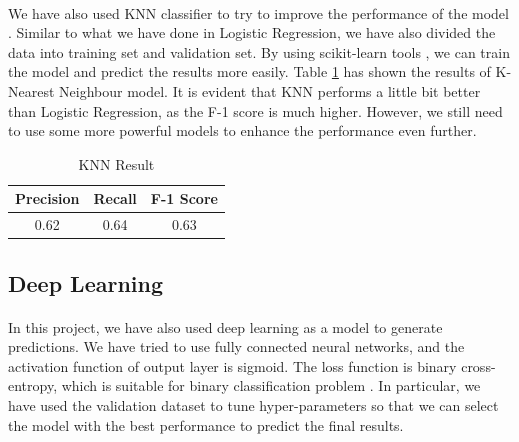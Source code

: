 \documentclass[fleqn,11pt]{olplainarticle}
\begin{document}
\paragraph*{}
We have also used KNN classifier to try to improve the performance of the model \citep{Rebala2019}. Similar to what we have done in Logistic Regression, we have also divided the data into training set and validation set. By using scikit-learn tools \citep{scikit-learn}, we can train the model and predict the results more easily. Table \ref{tab:knn} has shown the results of K-Nearest Neighbour model. It is evident that KNN performs a little bit better than Logistic Regression, as the F-1 score is much higher. However, we still need to use some more powerful models to enhance the performance even further.

\begin{table}[!htbp]
\centering
\caption{KNN Result}\label{tab:knn}
\begin{tabular}{ccc}
\toprule
Precision& Recall& F-1 Score\\
\midrule
0.62& 0.64& 0.63\\
\bottomrule
\end{tabular}
\end{table}



\subsection{Deep Learning}\label{dnn}
\paragraph*{}
In this project, we have also used deep learning as a model to generate predictions. We have tried to use fully connected neural networks, and the activation function of output layer is sigmoid. The loss function is binary cross-entropy, which is suitable for binary classification problem \citep{tensorflow2015-whitepaper}. In particular, we have used the validation dataset to tune hyper-parameters so that we can select the model with the best performance to predict the final results.
\end{document}

